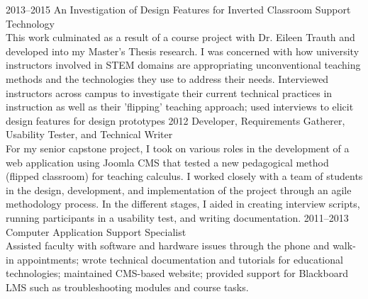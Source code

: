 \documentclass[]{cv-style}          %
\begin{document}
\begin{entrylist}
\entry
  {2013--2015}
  {An Investigation of Design Features for Inverted Classroom Support Technology}
  {}
  {\\
  This work culminated as a result of a course project with Dr. Eileen Trauth and developed into my Master's Thesis research. I was concerned with how university instructors involved in STEM domains are appropriating unconventional teaching methods and the technologies they use to address their needs. Interviewed instructors across campus to investigate their current technical practices in instruction as well as their 'flipping' teaching approach; used interviews to elicit design features for design prototypes}
 \entry
  {2012}
  {Developer, Requirements Gatherer, Usability Tester, and Technical Writer}
  {}
  {\\
   For my senior capstone project, I took on various roles in the development of a web application using Joomla CMS that tested a new pedagogical method (flipped classroom) for teaching calculus. I worked closely with a team of students in the design, development, and implementation of the project through an agile methodology process. In the different stages, I aided in creating interview scripts, running participants in a usability test, and writing documentation.}
\entry
  {2011--2013}
  {Computer Application Support Specialist}
  {}
  {\\
  Assisted faculty with software and hardware issues through the phone and walk-in appointments; wrote technical documentation and tutorials for educational technologies; maintained CMS-based website; provided support for Blackboard LMS such as troubleshooting modules and course tasks.} 
\end{entrylist}

\end{document}
